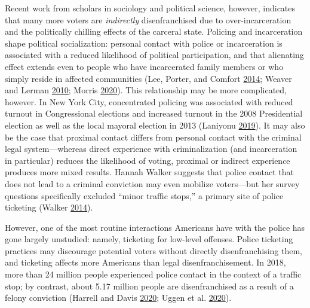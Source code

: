 \documentclass[
  12pt,
]{article}
\begin{document}
Recent work from scholars in sociology and political science, however, indicates that many more voters are \emph{indirectly} disenfranchised due to over-incarceration and the politically chilling effects of the carceral state. Policing and incarceration shape political socialization: personal contact with police or incarceration is associated with a reduced likelihood of political participation, and that alienating effect extends even to people who have incarcerated family members or who simply reside in affected communities (Lee, Porter, and Comfort \protect\hyperlink{ref-Lee2014}{2014}; Weaver and Lerman \protect\hyperlink{ref-Weaver2010}{2010}; Morris \protect\hyperlink{ref-Morris2020}{2020}). This relationship may be more complicated, however. In New York City, concentrated policing was associated with reduced turnout in Congressional elections and increased turnout in the 2008 Presidential election as well as the local mayoral election in 2013 (Laniyonu \protect\hyperlink{ref-Laniyonu2019}{2019}). It may also be the case that proximal contact differs from personal contact with the criminal legal system---whereas direct experience with criminalization (and incarceration in particular) reduces the likelihood of voting, proximal or indirect experience produces more mixed results. Hannah Walker suggests that police contact that does not lead to a criminal conviction may even mobilize voters---but her survey questions specifically excluded ``minor traffic stops,'' a primary site of police ticketing (Walker \protect\hyperlink{ref-Walker2014}{2014}).

However, one of the most routine interactions Americans have with the police has gone largely unstudied: namely, ticketing for low-level offenses. Police ticketing practices may discourage potential voters without directly disenfranchising them, and ticketing affects more Americans than legal disenfranchisement. In 2018, more than 24 million people experienced police contact in the context of a traffic stop; by contrast, about 5.17 million people are disenfranchised as a result of a felony conviction (Harrell and Davis \protect\hyperlink{ref-Harrell2020}{2020}; Uggen et al. \protect\hyperlink{ref-Uggen2020}{2020}).
\end{document}
